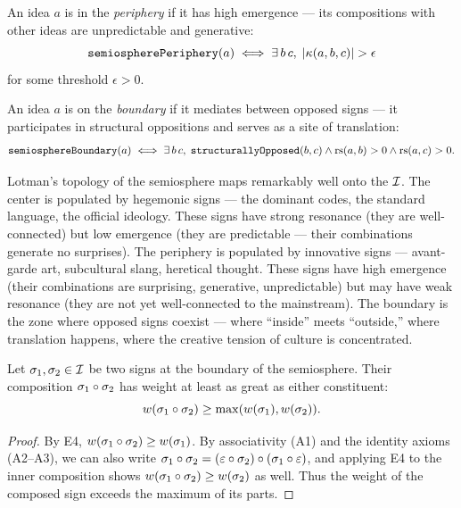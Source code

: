 \begin{definition}
\label{def:periphery}
An idea $a$ is in the \emph{periphery} if it has high emergence ---
its compositions with other ideas are unpredictable and generative:
\[
  \texttt{semiospherePeriphery}(a) \iff
  \exists\, b\, c,\; |\kappa(a, b, c)| > \epsilon
\]
for some threshold $\epsilon > 0$.
\end{definition}

\begin{definition}
\label{def:boundary}
An idea $a$ is on the \emph{boundary} if it mediates between opposed
signs --- it participates in structural oppositions and serves as a
site of translation:
\[
  \texttt{semiosphereBoundary}(a) \iff
  \exists\, b\, c,\; \texttt{structurallyOpposed}(b, c) \wedge
  \mathrm{rs}(a, b) > 0 \wedge \mathrm{rs}(a, c) > 0.
\]
\end{definition}

\begin{interpretation}
Lotman's topology of the semiosphere maps remarkably well onto the
$\mathcal{I}$. The center is populated by hegemonic signs --- the dominant
codes, the standard language, the official ideology. These signs have
strong resonance (they are well-connected) but low emergence (they
are predictable --- their combinations generate no surprises). The
periphery is populated by innovative signs --- avant-garde art,
subcultural slang, heretical thought. These signs have high emergence
(their combinations are surprising, generative, unpredictable) but
may have weak resonance (they are not yet well-connected to the
mainstream). The boundary is the zone where opposed signs coexist
--- where ``inside'' meets ``outside,'' where translation happens,
where the creative tension of culture is concentrated.
\end{interpretation}

\begin{theorem}
\label{thm:semiosphere-enrichment}
Let $\sigma_1, \sigma_2 \in \mathcal{I}$ be two signs at the boundary of the semiosphere. Their composition $\sigma_1 \circ \sigma_2$ has weight at least as great as either constituent:
\[
  w(\sigma_1 \circ \sigma_2) \geq \max(w(\sigma_1), w(\sigma_2)).
\]
\end{theorem}

\begin{proof}
By E4, $w(\sigma_1 \circ \sigma_2) \geq w(\sigma_1)$. By associativity (A1) and the identity axioms (A2--A3), we can also write $\sigma_1 \circ \sigma_2 = (\varepsilon \circ \sigma_2) \circ (\sigma_1 \circ \varepsilon)$, and applying E4 to the inner composition shows $w(\sigma_1 \circ \sigma_2) \geq w(\sigma_2)$ as well. Thus the weight of the composed sign exceeds the maximum of its parts.
\end{proof}

